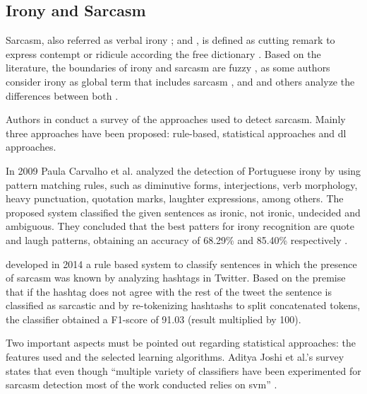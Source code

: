 \subsection{Irony and Sarcasm}
\label{subsec:irony_sarcasm}

Sarcasm, also referred as verbal irony \cite{giora2013negation}; \cite{giora2015defaultness} and \cite{giora2015default}, is defined as cutting remark to express contempt or ridicule according the free dictionary \cite{sarcasmFreeDictionary}. Based on the literature, the boundaries of irony and sarcasm are fuzzy \cite{bosco2013developing}, as some authors consider irony as global term that includes sarcasm \cite{gibbs1991psychological}, \cite{wilson2006pragmatics} and \cite{kreuz1993empirical} and others analyze the differences between both \cite{filatova2012irony}.

Authors in \cite{joshi2016automatic} conduct a survey of the approaches used to detect sarcasm. Mainly three approaches have been proposed: rule-based, statistical approaches and \acrlong{dl} approaches.

In 2009 Paula Carvalho et al. analyzed the detection of Portuguese irony by using pattern matching rules, such as diminutive forms, interjections, verb morphology, heavy punctuation, quotation marks, laughter expressions, among others. The proposed system classified the given sentences as ironic, not ironic, undecided and ambiguous. They concluded that the best patters for irony recognition are quote and laugh patterns, obtaining an accuracy of 68.29\% and 85.40\% respectively \cite{carvalho2009clues}.

\cite{maynard2014cares} developed in 2014 a rule based system to classify sentences in which the presence of sarcasm was known by analyzing hashtags in Twitter. Based on the premise that if the hashtag does not agree with the rest of the tweet the sentence is classified as sarcastic and by re-tokenizing hashtashs to split concatenated tokens, the classifier obtained a F1-score of 91.03 (result multiplied by 100).

Two important aspects must be pointed out regarding statistical approaches: the features used and the selected learning algorithms. Aditya Joshi et al.'s survey states that even though ``multiple variety of classifiers have been experimented for sarcasm detection most of the work conducted relies on \acrshort{svm}'' \cite{joshi2016automatic}.

